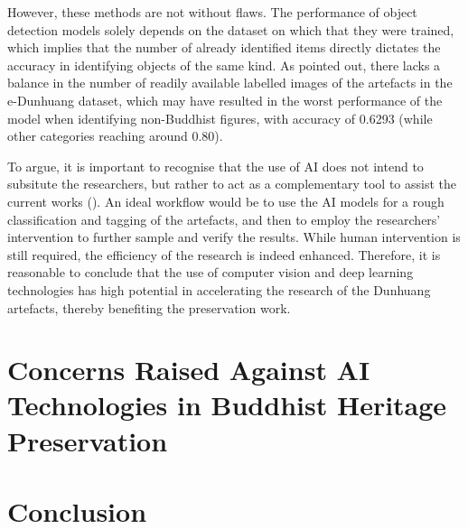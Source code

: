 However, these methods are not without flaws. The performance of object detection models solely depends on the
dataset on which that they were trained, which implies that the number of already identified items directly
dictates the accuracy in identifying objects of the same kind. As  pointed out,
there lacks a balance in the number of readily available labelled images of the artefacts in the e-Dunhuang
dataset, which may have resulted in the worst performance of the model when identifying non-Buddhist figures,
with accuracy of 0.6293 (while other categories reaching around 0.80).

To argue, it is important to recognise that the use of AI does not intend to subsitute the researchers, but rather
to act as a complementary tool to assist the current works
(). An ideal workflow would be to use the AI models for
a rough classification and tagging of the artefacts, and then to employ the researchers' intervention to further
sample and verify the results. While human intervention is still required, the efficiency of the research is indeed
enhanced. Therefore, it is reasonable to conclude that the use of computer vision and deep learning technologies
has high potential in accelerating the research of the Dunhuang artefacts, thereby benefiting the preservation
work.

\section{Concerns Raised Against AI Technologies in Buddhist Heritage Preservation}

\section{Conclusion}

\printbibliography